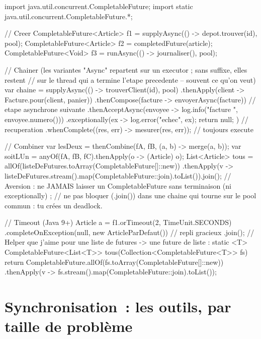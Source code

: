 \documentclass[12pt,a4paper,twoside,openright]{book}
\begin{document}
\begin{codejava}
import java.util.concurrent.CompletableFuture;
import static java.util.concurrent.CompletableFuture.*;

// Creer
CompletableFuture<Article> f1 = supplyAsync(() -> depot.trouver(id), pool);
CompletableFuture<Article> f2 = completedFuture(article);
CompletableFuture<Void> f3 = runAsync(() -> journaliser(), pool);

// Chainer (les variantes "Async" repartent sur un executor ; sans suffixe, elles restent
// sur le thread qui a termine l'etape precedente -- souvent ce qu'on veut)
var chaine = supplyAsync(() -> trouverClient(id), pool)
        .thenApply(client -> Facture.pour(client, panier))
        .thenCompose(facture -> envoyerAsync(facture))            // etape asynchrone suivante
        .thenAcceptAsync(envoyee -> log.info("facture {}", envoyee.numero()))
        .exceptionally(ex -> { log.error("echec", ex); return null; })   // recuperation
        .whenComplete((res, err) -> mesurer(res, err));                    // toujours execute

// Combiner
var lesDeux = thenCombine(fA, fB, (a, b) -> merge(a, b));
var soitLUn = anyOf(fA, fB, fC).thenApply(o -> (Article) o);
List<Article> tous = allOf(listeDeFutures.toArray(CompletableFuture[]::new))
        .thenApply(v -> listeDeFutures.stream().map(CompletableFuture::join).toList()).join();
// Aversion : ne JAMAIS laisser un CompletableFuture sans terminaison (ni exceptionally) ;
// ne pas bloquer (.join()) dans une chaine qui tourne sur le pool commun : tu cr\'ees un deadlock.

// Timeout (Java 9+)
Article a = f1.orTimeout(2, TimeUnit.SECONDS)
              .completeOnException(null, new ArticleParDefaut())   // repli gracieux
              .join();
// Helper que j'aime pour une liste de futures -> une future de liste :
static <T> CompletableFuture<List<T>> tous(Collection<CompletableFuture<T>> fs) {
    return CompletableFuture.allOf(fs.toArray(CompletableFuture[]::new))
            .thenApply(v -> fs.stream().map(CompletableFuture::join).toList());
}
\end{codejava}

\section{Synchronisation~: les outils, par taille de probl\`eme}
\end{document}
